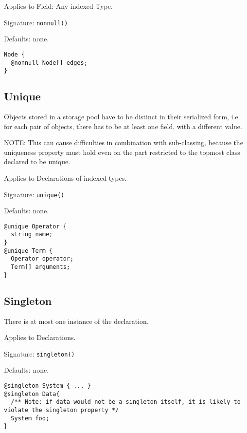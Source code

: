 Applies to Field: Any indexed Type.

Signature: \verb/nonnull()/

Defaults: none.

\begin{lstlisting}[label=nonnullExample,caption=Examples,language=skill]
Node {
  @nonnull Node[] edges;
}
\end{lstlisting}


\subsection*{Unique}
Objects stored in a storage pool have to be distinct in their serialized form, i.e. for each pair of objects, there has to be at least one field, with a different value.

NOTE: This can cause difficulties in combination with sub-classing, because the uniqueness property must hold even on the part restricted to the topmost class declared to be unique.

Applies to Declarations of indexed types.

Signature: \verb/unique()/

Defaults: none.

\begin{lstlisting}[label=uniqueExample,caption=Examples,language=skill]
@unique Operator {
  string name;
}
@unique Term {
  Operator operator;
  Term[] arguments;
}
\end{lstlisting}


\subsection*{Singleton}
There is at most one instance of the declaration.

Applies to Declarations.

Signature: \verb/singleton()/

Defaults: none.

\begin{lstlisting}[label=singletonExample,caption=Examples,language=skill]
@singleton System { ... }
@singleton Data{
  /** Note: if data would not be a singleton itself, it is likely to violate the singleton property */
  System foo;
}
\end{lstlisting}





